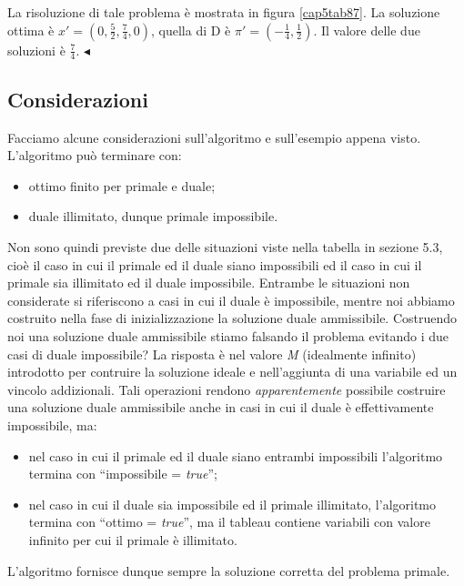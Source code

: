 \documentclass[11pt]{book}
\begin{document}
La risoluzione di tale problema \`e mostrata in figura
\ref{cap5tab87}. La soluzione ottima \`e $x' =
(0,\frac{5}{2},\frac{7}{4},0)$, quella di D \`e $\pi' =
(-\frac{1}{4},\frac{1}{2})$. Il valore delle due soluzioni \`e
$\frac{7}{4}$. $\blacktriangleleft$\vspace{11pt}

\subsection{Considerazioni}

Facciamo alcune considerazioni sull'algoritmo e sull'esempio appena
visto. L'algoritmo pu\`o terminare con:

\begin{itemize}
\item ottimo finito per primale e duale;
\item duale illimitato, dunque primale impossibile.
\end{itemize}

Non sono quindi previste due delle situazioni viste nella tabella in
sezione 5.3, cio\`e il caso in cui il primale ed il duale siano
impossibili ed il caso in cui il primale sia illimitato ed il duale
impossibile. Entrambe le situazioni non considerate si riferiscono a
casi in cui il duale \`e impossibile, mentre noi abbiamo costruito
nella fase di inizializzazione la soluzione duale
ammissibile. Costruendo noi una soluzione duale ammissibile stiamo
falsando il problema evitando i due casi di duale impossibile? La
risposta \`e nel valore {\em M} (idealmente infinito) introdotto per
contruire la soluzione ideale e nell'aggiunta di una variabile ed un
vincolo addizionali. Tali operazioni rendono {\em apparentemente}
possibile costruire una soluzione duale ammissibile anche in casi in
cui il duale \`e effettivamente impossibile, ma:

\begin{itemize}
\item nel caso in cui il primale ed il duale siano entrambi
  impossibili l'algoritmo termina con ``impossibile = {\em true}'';

\item nel caso in cui il duale sia impossibile ed il primale
illimitato, l'algoritmo termina con ``ottimo = {\em true}'', ma il
tableau contiene variabili con valore infinito per cui il primale \`e
illimitato.
\end{itemize}

L'algoritmo fornisce dunque sempre la soluzione corretta del problema
primale.
\end{document}
